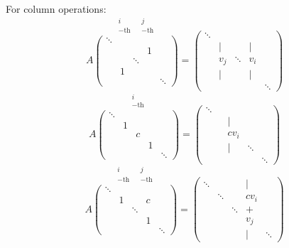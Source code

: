 \begin{enumerate}
For column operations:
\[A\overset{\left.\begin{array}{ccccc} & i&&j&\\&\mathrm{-th}&&\mathrm{-th} &\end{array}\right.}{\left(\begin{array}{ccccc}\ddots&&&& \\&&&1& \\&&\ddots && \\&1&&& \\&&&&\ddots \end{array}\right)}=\left(\begin{array}{ccccc}\ddots&&&& \\&|&&|& \\&v_j&\ddots &v_i& \\&|&&|& \\&&&&\ddots \end{array}\right)\]
\[A\overset{\left.\begin{array}{ccccc} & &i&&\\&&\mathrm{-th}&&\end{array}\right.}{\left(\begin{array}{ccccc}\ddots&&&& \\&1&&& \\&&c && \\&&&1& \\&&&&\ddots \end{array}\right)}=\left(\begin{array}{ccccc}\ddots&&&& \\&&|&& \\&&cv_i && \\&&|&\ddots& \\&&&&\ddots \end{array}\right)\]
\[A\overset{\left.\begin{array}{ccccc} & i&&j&\\&\mathrm{-th}&&\mathrm{-th} &\end{array}\right.}{\left(\begin{array}{ccccc}\ddots&&&& \\&1&&c& \\&&\ddots && \\&&&1& \\&&&&\ddots \end{array}\right)}=\left(\begin{array}{ccccc}\ddots&&&|& \\&\ddots &&cv_i& \\&&\ddots &+& \\&&&v_j& \\&&&|&\ddots \end{array}\right)\]


\end{enumerate}
